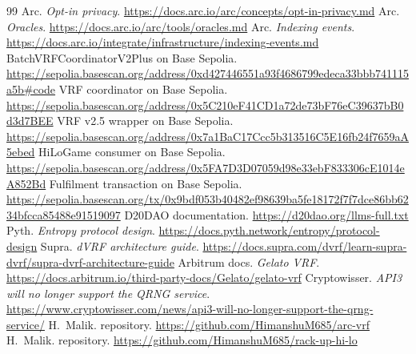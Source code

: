 \documentclass[11pt,a4paper]{article}
\begin{document}
\begin{thebibliography}{99}
 Arc. \emph{Opt-in privacy}. \url{https://docs.arc.io/arc/concepts/opt-in-privacy.md}
 Arc. \emph{Oracles}. \url{https://docs.arc.io/arc/tools/oracles.md}
 Arc. \emph{Indexing events}. \url{https://docs.arc.io/integrate/infrastructure/indexing-events.md}
 BatchVRFCoordinatorV2Plus on Base Sepolia. \url{https://sepolia.basescan.org/address/0xd427446551a93f4686799edeca33bbb741115a5b#code}
 VRF coordinator on Base Sepolia. \url{https://sepolia.basescan.org/address/0x5C210eF41CD1a72de73bF76eC39637bB0d3d7BEE}
 VRF v2.5 wrapper on Base Sepolia. \url{https://sepolia.basescan.org/address/0x7a1BaC17Ccc5b313516C5E16fb24f7659aA5ebed}
 HiLoGame consumer on Base Sepolia. \url{https://sepolia.basescan.org/address/0x5FA7D3D07059d98e33ebF833306cE1014eA852Bd}
 Fulfilment transaction on Base Sepolia. \url{https://sepolia.basescan.org/tx/0x9bdf053b40482ef98639ba5fe18172f7f7dce86bb6234bfcca85488e91519097}
 D20DAO documentation. \url{https://d20dao.org/llms-full.txt}
 Pyth. \emph{Entropy protocol design}. \url{https://docs.pyth.network/entropy/protocol-design}
 Supra. \emph{dVRF architecture guide}. \url{https://docs.supra.com/dvrf/learn-supra-dvrf/supra-dvrf-architecture-guide}
 Arbitrum docs. \emph{Gelato VRF}. \url{https://docs.arbitrum.io/third-party-docs/Gelato/gelato-vrf}
 Cryptowisser. \emph{API3 will no longer support the QRNG service}. \url{https://www.cryptowisser.com/news/api3-will-no-longer-support-the-qrng-service/}
 H.~Malik.  repository. \url{https://github.com/HimanshuM685/arc-vrf}
 H.~Malik.  repository. \url{https://github.com/HimanshuM685/rack-up-hi-lo}
\end{thebibliography}

\nocite{clproduct,cledu1,cledu2,clbilling,clcoordinator,clsubapi,clconsumer,clbhs,repohilo}
\end{document}
